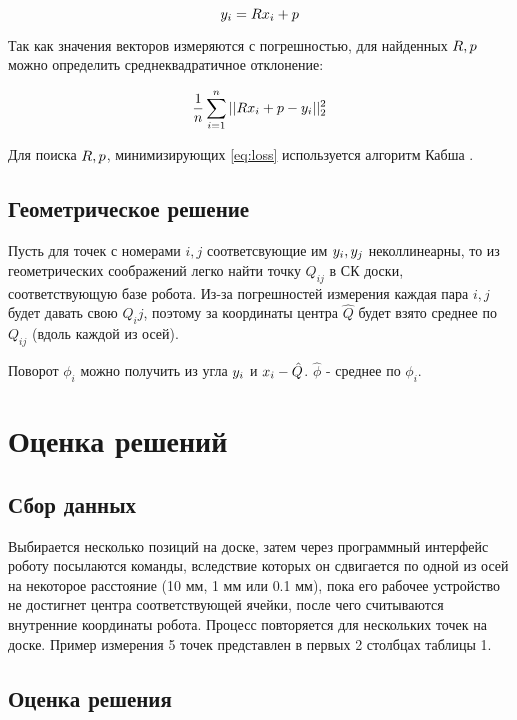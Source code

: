 \documentclass[a4paper,12pt]{extarticle}
\begin{document}
\begin{equation}
    \boldmath{y}_i = R\boldmath{x}_i + \boldmath{p}
    \label{eq:transformation}
\end{equation}
    
Так как значения векторов измеряются с погрешностью, для найденных $R, \boldmath{p}$ можно определить среднеквадратичное отклонение:

\begin{equation}
    \dfrac{1}{n}\sum\limits_{i=1}^n ||R\boldmath{x}_i + \boldmath{p} - \boldmath{y}_i||_2^2
    \label{eq:loss}
\end{equation}

Для поиска $R, \boldmath{p}$, минимизирующих \ref{eq:loss} используется алгоритм Кабша \cite{Kabsch}.

\subsection{Геометрическое решение}

Пусть для точек с номерами $i, j$ соответсвующие им $\boldmath{y}_i, \boldmath{y}_j$ неколлинеарны, то из геометрических соображений легко найти точку $Q_{ij}$ в СК доски, соответствующую базе робота. Из-за погрешностей измерения каждая пара $i, j$ будет давать свою $Q_ij$, поэтому за координаты центра $\hat Q$ будет взято среднее по $Q_{ij}$ (вдоль каждой из осей).

Поворот $\phi_{i}$ можно получить из угла $\boldmath{y}_i$ и $\boldmath{x}_i - \hat Q$. $\hat\phi$ - среднее по $\phi_i$.

\section{Оценка решений}

\subsection{Сбор данных}

Выбирается несколько позиций на доске, затем через программный интерфейс роботу посылаются команды, вследствие которых он сдвигается по одной из осей на некоторое расстояние (10 мм, 1 мм или 0.1 мм), пока его рабочее устройство не достигнет центра соответствующей ячейки, после чего считываются внутренние координаты робота. Процесс повторяется для нескольких точек на доске. Пример измерения 5 точек представлен в первых 2 столбцах таблицы 1. 

\subsection{Оценка решения}
\end{document}
